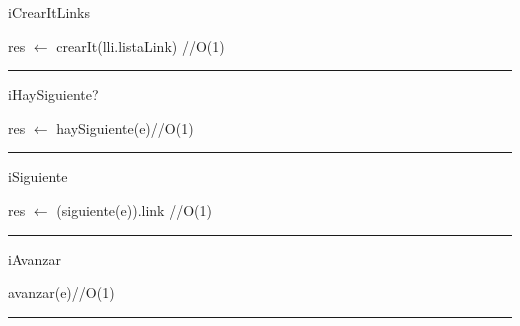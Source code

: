 \begin{algorithm}[H]
\caption{iCrearItLinks}
\begin{algorithmic}[1]
\State res $\gets$ crearIt(lli.listaLink) \hfill //O(1)
\EndFunction 
\end{algorithmic}
\hrule
{}
\end{algorithm}

\begin{algorithm}[H]
\caption{iHaySiguiente?}
\begin{algorithmic}[1]
\state res $\gets$ haySiguiente(e)\hfill //O(1)
\EndFunction 
\end{algorithmic}
\hrule
{}
\end{algorithm}

\begin{algorithm}[H]
\caption{iSiguiente}
\begin{algorithmic}[1]
\state res $\gets$ (siguiente(e)).link \hfill //O(1)
\EndFunction 
\end{algorithmic}
\hrule
{}
\end{algorithm}

\begin{algorithm}[H]
\caption{iAvanzar}
\begin{algorithmic}[1]
\state avanzar(e)\hfill //O(1)
\EndFunction 
\end{algorithmic}
\hrule
{}
\end{algorithm}